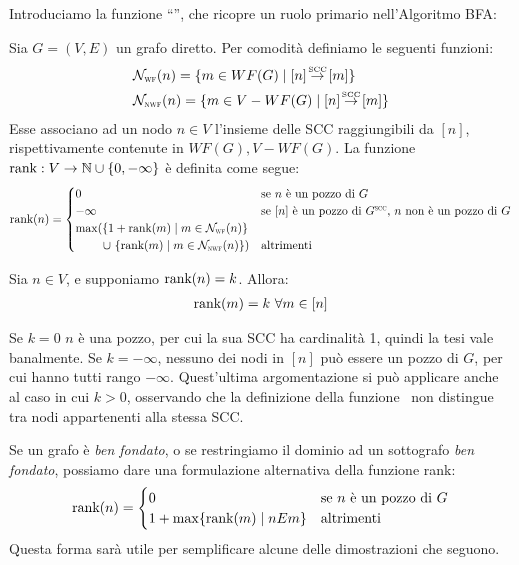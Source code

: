 Introduciamo la funzione ``\rankfunc'', che ricopre un ruolo primario nell'Algoritmo BFA:
\begin{definition}
    Sia $G = (V,E)$ un grafo diretto. Per comodità definiamo le seguenti funzioni:
    \begin{align*}
        &\mathcal{N}_{\scalebox{0.5}{WF}}(n) = \{m \in WF(G) \mid [n] \sccto [m]\}\\
        &\mathcal{N}_{\scalebox{0.5}{NWF}}(n) = \{m \in V - WF(G) \mid [n] \sccto [m]\}
    \end{align*}
    Esse associano ad un nodo $n \in V$ l'insieme delle SCC raggiungibili da $[n]$, rispettivamente contenute in $WF(G), V - WF(G)$.
    La funzione $\textup{rank}: V \to \mathbb{N} \cup \{0, -\infty\}$ è definita come segue:
    \begin{gather*}
        \rankfunc(n) = \begin{cases}
            0 &\text{se $n$ è un pozzo di $G$}\\
            -\infty &\text{se $[n]$ è un pozzo di $G^{\scalebox{.5}{SCC}}$, $n$ non è un pozzo di $G$}\\
            \max(\{1 + \rankfunc(m) \mid m \in \mathcal{N_{\scalebox{0.5}{WF}}}(n)\}\\
            \,\,\,\,\,\,\,\,\,\,\,\,\,\, \cup \,\, \{\rankfunc(m) \mid m \in \mathcal{N_{\scalebox{0.5}{NWF}}}(n)\}) &\text{altrimenti}
        \end{cases}
    \end{gather*}
\end{definition}
\begin{observation}
    Sia $n \in V$, e supponiamo $\textup{rank}(n) = k$. Allora:
    \begin{gather*}
        \textup{rank}(m) = k \,\,\forall m \in [n]
    \end{gather*}
\end{observation}
\begin{proof2}
    Se $k = 0$ $n$ è una pozzo, per cui la sua SCC ha cardinalità 1, quindi la tesi vale banalmente. Se $k = -\infty$, nessuno dei nodi in $[n]$ può essere un pozzo di $G$, per cui hanno tutti rango $-\infty$. Quest'ultima argomentazione si può applicare anche al caso in cui $k > 0$, osservando che la definizione della funzione \rankfunc \, non distingue tra nodi appartenenti alla stessa SCC.
\end{proof2}
Se un grafo è \emph{ben fondato}, o se restringiamo il dominio ad un sottografo \emph{ben fondato}, possiamo dare una formulazione alternativa della funzione rank:
\begin{gather*}
        \textup{rank}(n) = \begin{cases}
            0 &\text{se $n$ è un pozzo di $G$}\\
            1 + \max\{\textup{rank}(m) \mid n E m\} &\text{altrimenti}
        \end{cases}
\end{gather*}
Questa forma sarà utile per semplificare alcune delle dimostrazioni che seguono.

